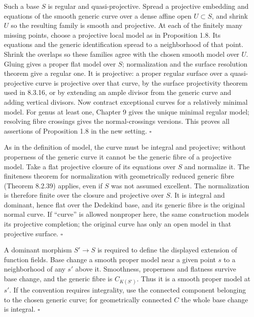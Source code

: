\documentclass[11pt]{article}
\let\chapterexercise\exercise
\renewcommand{\exercise}[2]{\Needspace{8\baselineskip}\chapterexercise{#1}{#2}}
\begin{document}
\pf Such a base $S$ is regular and quasi-projective. Spread a projective embedding and equations of the smooth generic curve over a dense affine open $U\subset S$, and shrink $U$ so the resulting family is smooth and projective. At each of the finitely many missing points, choose a projective local model as in Proposition 1.8. Its equations and the generic identification spread to a neighborhood of that point. Shrink the overlaps so these families agree with the chosen smooth model over $U$. Gluing gives a proper flat model over $S$; normalization and the surface resolution theorem give a regular one. It is projective: a proper regular surface over a quasi-projective curve is projective over that curve, by the surface projectivity theorem used in 8.3.16, or by extending an ample divisor from the generic curve and adding vertical divisors. Now contract exceptional curves for a relatively minimal model. For genus at least one, Chapter 9 gives the unique minimal regular model; resolving fibre crossings gives the normal-crossings versions. This proves all assertions of Proposition 1.8 in the new setting. \hfill$\square$

\pf As in the definition of model, the curve must be integral and projective; without properness of the generic curve it cannot be the generic fibre of a projective model. Take a flat projective closure of its equations over $S$ and normalize it. The finiteness theorem for normalization with geometrically reduced generic fibre (Theorem 8.2.39) applies, even if $S$ was not assumed excellent. The normalization is therefore finite over the closure and projective over $S$. It is integral and dominant, hence flat over the Dedekind base, and its generic fibre is the original normal curve. If ``curve'' is allowed nonproper here, the same construction models its projective completion; the original curve has only an open model in that projective surface. \hfill$\square$

\pf A dominant morphism $S'\to S$ is required to define the displayed extension of function fields. Base change a smooth proper model near a given point $s$ to a neighborhood of any $s'$ above it. Smoothness, properness and flatness survive base change, and the generic fibre is $C_{K(S')}$. Thus it is a smooth proper model at $s'$. If the convention requires integrality, use the connected component belonging to the chosen generic curve; for geometrically connected $C$ the whole base change is integral. \hfill$\square$
\end{document}
